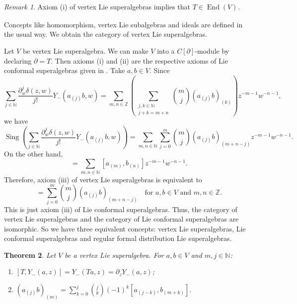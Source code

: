\documentclass[a4paper, 12pt, reqno]{amsart}
\newtheorem{theorem}{Theorem}[section]
\theoremstyle{remark}
\newtheorem{remark}[theorem]{Remark}
\numberwithin{equation}{subsection}
\DeclareMathOperator{\End}{End}
\DeclareMathOperator{\zero}{\overline{0}}
\DeclareMathOperator{\Sing}{Sing}
\begin{document}
\begin{remark}
  \label{rmk:33}
  Axiom (i) of vertex Lie superalgebras implies that $T \in \End(V)_{\zero}$.
\end{remark}

Concepts like homomorphism, vertex Lie subalgebras and ideals are defined in the usual way.
We obtain the category of vertex Lie superalgebras.

Let $V$ be vertex Lie superalgebra.
We can make $V$ into a $C[\partial]$-module by declaring $\partial = T$.
Then axioms (i) and (ii) are the respective axioms of Lie conformal superalgebras given in .
Take $a, b \in V$.
Since
\begin{equation*}
  \sum_{j \in \mathbb{N}}\frac{\partial^j_w\delta(z, w)}{j!}Y_-(a_{(j)}b, w) = \sum_{m, n \in \mathbb{Z}}\left(\sum_{\substack{j, k \in \mathbb{N} \\ j + k = m + n}}\binom{m}{j}(a_{(j)}b)_{(k)}\right)z^{-m - 1}w^{-n - 1},
\end{equation*}
we have
\begin{equation*}
  \Sing\left(\sum_{j \in \mathbb{N}}\frac{\partial^j_w\delta(z, w)}{j!}Y_-(a_{(j)}b, w)\right) = \sum_{m, n \in \mathbb{N}}\sum_{j = 0}^m\binom{m}{j}(a_{(j)}b)_{(m + n - j)}z^{-m - 1}w^{-n - 1}.
\end{equation*}
On the other hand,
\begin{equation*}
  [Y_-(a, z), Y_-(b, w)] = \sum_{m, n \in \mathbb{N}}[a_{(m)}, b_{(n)}]z^{-m - 1}w^{-n - 1}.
\end{equation*}
Therefore, axiom (iii) of vertex Lie superalgebras is equivalent to
\begin{equation*}
  [a_{(m)}, b_{(n)}] = \sum_{j = 0}^m\binom{m}{j}(a_{(j)}b)_{(m + n - j)} \quad \text{for }a, b \in V\text{ and }m, n \in \mathbb{Z}.
\end{equation*}
This is just axiom (iii) of Lie conformal superalgebras.
Thus, the category of vertex Lie superalgebras and the category of Lie conformal superalgebras are isomorphic.
So we have three equivalent concepts: vertex Lie superalgebras, Lie conformal superalgebras and regular formal distribution Lie superalgebras.

\begin{theorem}
  \label{thr:42}
  Let $V$ be a vertex Lie superalgebra.
  For $a, b \in V$ and $m, j \in \mathbb{N}$:
  \begin{enumerate}
  \item $[T, Y_-(a, z)] = Y_-(Ta, z) = \partial_zY_-(a, z)$;
  \item $(a_{(j)}b)_{(m)} = \sum_{k = 0}^j\binom{j}{k}(-1)^k[a_{(j - k)},b_{(m + k)}]$.
  \end{enumerate}
\end{theorem}
\end{document}
